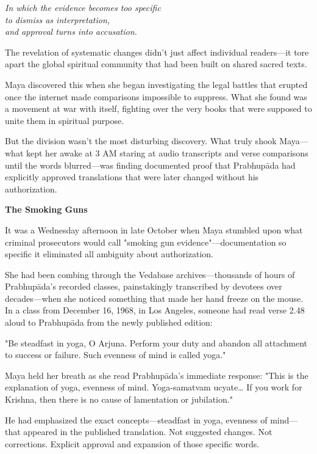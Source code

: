 \documentclass[12pt,twoside]{book}
\begin{document}
{\centering\itshape In which the evidence becomes too specific\\to dismiss as interpretation,\\and approval turns into accusation.\par}
\vspace{0.3cm}

\normalfont\justifying
The revelation of systematic changes didn't just affect individual readers—it tore apart the global spiritual community that had been built on shared sacred texts.

Maya discovered this when she began investigating the legal battles that erupted once the internet made comparisons impossible to suppress. What she found was a movement at war with itself, fighting over the very books that were supposed to unite them in spiritual purpose.

But the division wasn't the most disturbing discovery. What truly shook Maya—what kept her awake at 3 AM staring at audio transcripts and verse comparisons until the words blurred—was finding documented proof that Prabhupāda had explicitly approved translations that were later changed without his authorization.


\vspace{0.5cm}
\textbf{The Smoking Guns}
\vspace{0.2cm}


It was a Wednesday afternoon in late October when Maya stumbled upon what criminal prosecutors would call "smoking gun evidence"—documentation so specific it eliminated all ambiguity about authorization.

She had been combing through the Vedabase archives—thousands of hours of Prabhupāda's recorded classes, painstakingly transcribed by devotees over decades—when she noticed something that made her hand freeze on the mouse. In a class from December 16, 1968, in Los Angeles, someone had read verse 2.48 aloud to Prabhupāda from the newly published edition:

"Be steadfast in yoga, O Arjuna. Perform your duty and abandon all attachment to success or failure. Such evenness of mind is called yoga."

Maya held her breath as she read Prabhupāda's immediate response: "This is the explanation of yoga, evenness of mind. Yoga-samatvam ucyate\ldots{} If you work for Krishna, then there is no cause of lamentation or jubilation."

He had emphasized the exact concepts—steadfast in yoga, evenness of mind—that appeared in the published translation. Not suggested changes. Not corrections. Explicit approval and expansion of those specific words.
\end{document}

